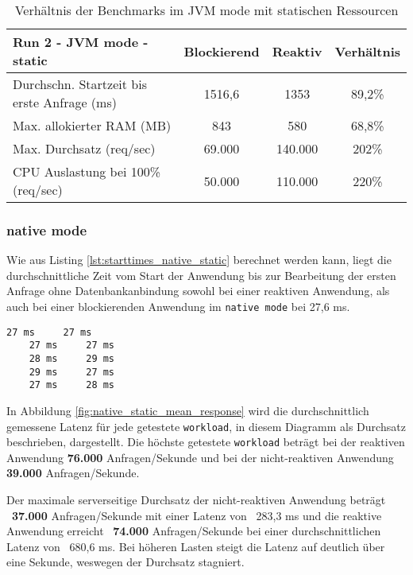 \begin{table}[ht!]
    \begin{tabular}{|l | c | c | c|}
        \hline
        Run 2 - JVM mode - static & Blockierend & Reaktiv & Verhältnis \\
        \hline
        \makecell[l]{Durchschn. Startzeit bis                          \\erste Anfrage (ms)} & 1516,6      & 1353  & 89,2\%     \\
        \hline
        Max. allokierter RAM (MB) & 843         & 580     & 68,8\%     \\
        \hline
        Max. Durchsatz (req/sec)  & 69.000      & 140.000 & 202\%      \\
        \hline
        \makecell[l]{CPU Auslastung bei 100\%                          \\ (req/sec)} & 50.000 & 110.000 & 220\%  \\
        \hline
    \end{tabular}
    \caption{Verhältnis der Benchmarks im JVM mode mit statischen Ressourcen}
    \label{table:static_jvm_measurement_results}
\end{table}

\subsubsection{native mode}
\label{subsubsec:static_native_mode}
Wie aus Listing \ref{lst:starttimes_native_static} berechnet werden kann, liegt die durchschnittliche Zeit vom Start der Anwendung bis
zur Bearbeitung der ersten Anfrage ohne Datenbankanbindung sowohl bei einer reaktiven Anwendung, als auch bei einer blockierenden
Anwendung im \verb|native mode| bei 27,6 ms.
\begin{lstlisting}[caption=Startzeiten im native mode mit statischen Ressourcen, captionpos=b, label=lst:starttimes_native_static]
    27 ms     27 ms
    27 ms     27 ms
    28 ms     29 ms
    29 ms     27 ms
    27 ms     28 ms
\end{lstlisting}
In Abbildung \ref{fig:native_static_mean_response} wird die durchschnittlich gemessene Latenz für jede getestete \verb|workload|,
in diesem Diagramm als Durchsatz beschrieben, dargestellt.
Die höchste getestete \verb|workload| beträgt bei der reaktiven Anwendung \textbf{76.000} Anfragen/Sekunde und bei der
nicht-reaktiven Anwendung \textbf{39.000} Anfragen/Sekunde.

Der maximale serverseitige Durchsatz der nicht-reaktiven Anwendung beträgt ~\textbf{37.000} Anfragen/Sekunde mit einer
Latenz von ~283,3 ms und
die reaktive Anwendung erreicht ~\textbf{74.000} Anfragen/Sekunde bei einer durchschnittlichen Latenz von ~680,6 ms.
Bei höheren Lasten steigt die Latenz auf deutlich über eine Sekunde, weswegen der Durchsatz stagniert.


